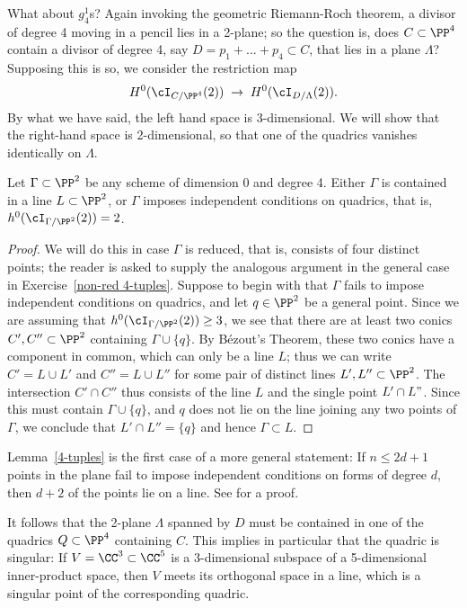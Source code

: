 What about $g^1_4$s? Again invoking the geometric Riemann-Roch theorem, a divisor of degree 4 moving in a pencil lies in a 2-plane; so the question is, does $C \subset \PP^4$ contain a divisor of degree 4, say $D = p_1+\dots +p_4 \subset C$, that lies in a plane $\Lambda$? Supposing this is so, we consider the restriction map
$$
H^0(\cI_{C/\PP^4}(2)) \; \to \; H^0(\cI_{D/\Lambda}(2)).
$$
By what we have said, the left hand space is 3-dimensional. We will show that the right-hand space
is 2-dimensional, so that one of the quadrics vanishes identically on $\Lambda$.

\begin{lemma}\label{4-tuples}
Let $\Gamma \subset \PP^2$ be any scheme of dimension 0 and degree 4. Either $\Gamma$ is contained in a line $L \subset \PP^2$, or $\Gamma$ imposes independent conditions on quadrics, that is, $h^0(\cI_{\Gamma /\PP^2}(2)) = 2$.
\end{lemma}

\begin{proof}
We will do this in case $\Gamma$ is reduced, that is, consists of four distinct points; the reader is asked to supply the analogous argument in the general case in Exercise~\ref{non-red 4-tuples}. Suppose to begin with that $\Gamma$ fails to impose independent conditions on quadrics, and let $q \in \PP^2$ be a general point. Since we are assuming that $h^0(\cI_{\Gamma /\PP^2}(2)) \geq 3$, we see that there are at least two conics $C', C'' \subset \PP^2$ containing $\Gamma \cup \{q\}$. By B\'ezout's Theorem, these two conics have a component in common, which can only be a line $L$; thus we can write $C' = L \cup L'$ and $C'' = L \cup L''$ for some pair of distinct lines $L', L'' \subset \PP^2$. The intersection $C' \cap C''$ thus consists of the line $L$ and the single point $L' \cap L"$. Since this must contain $\Gamma \cup \{q\}$, and $q$ does not lie on the line joining any two points of $\Gamma$, we conclude that $L' \cap L'' = \{q\}$ and hence $\Gamma \subset L$.
\end{proof}

\begin{fact}
Lemma~\ref{4-tuples} is the first case of a more general statement: If $n\leq 2d+1$ points in the plane fail to impose independent conditions on forms of degree $d$, then $d+2$ of the points lie on a line. See \cite[p. 302]{MR1376653} for a proof.
\end{fact}


 It follows that the 2-plane $\Lambda$ spanned by $D$ must be contained in one of the quadrics $Q \subset \PP^4$ containing $C$. This implies in particular that the quadric is singular: If $V = \CC^3\subset \CC^5$
is a  3-dimensional subspace of a 5-dimensional inner-product space, then $V$ meets its orthogonal space
in a line, which is a singular point of the corresponding quadric.
 
